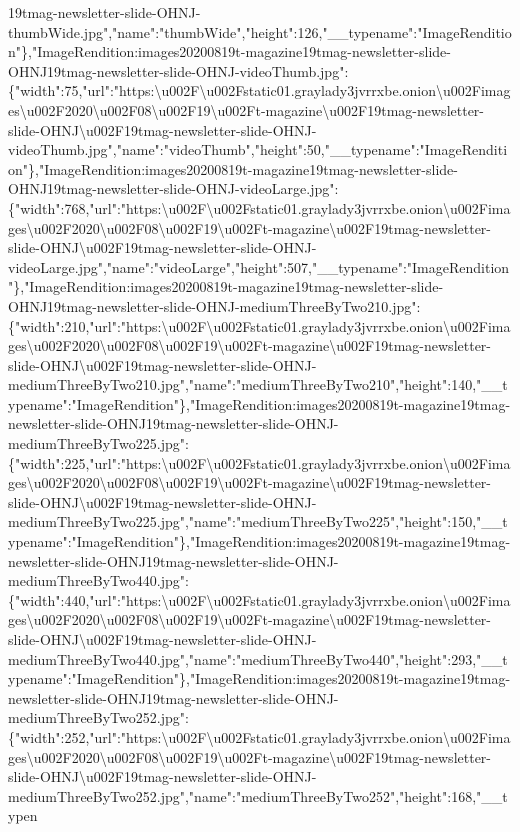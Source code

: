 19tmag-newsletter-slide-OHNJ-thumbWide.jpg","name":"thumbWide","height":126,"\_\_typename":"ImageRendition"\},"ImageRendition:images20200819t-magazine19tmag-newsletter-slide-OHNJ19tmag-newsletter-slide-OHNJ-videoThumb.jpg":\{"width":75,"url":"https:\textbackslash{}u002F\textbackslash{}u002Fstatic01.graylady3jvrrxbe.onion\textbackslash{}u002Fimages\textbackslash{}u002F2020\textbackslash{}u002F08\textbackslash{}u002F19\textbackslash{}u002Ft-magazine\textbackslash{}u002F19tmag-newsletter-slide-OHNJ\textbackslash{}u002F19tmag-newsletter-slide-OHNJ-videoThumb.jpg","name":"videoThumb","height":50,"\_\_typename":"ImageRendition"\},"ImageRendition:images20200819t-magazine19tmag-newsletter-slide-OHNJ19tmag-newsletter-slide-OHNJ-videoLarge.jpg":\{"width":768,"url":"https:\textbackslash{}u002F\textbackslash{}u002Fstatic01.graylady3jvrrxbe.onion\textbackslash{}u002Fimages\textbackslash{}u002F2020\textbackslash{}u002F08\textbackslash{}u002F19\textbackslash{}u002Ft-magazine\textbackslash{}u002F19tmag-newsletter-slide-OHNJ\textbackslash{}u002F19tmag-newsletter-slide-OHNJ-videoLarge.jpg","name":"videoLarge","height":507,"\_\_typename":"ImageRendition"\},"ImageRendition:images20200819t-magazine19tmag-newsletter-slide-OHNJ19tmag-newsletter-slide-OHNJ-mediumThreeByTwo210.jpg":\{"width":210,"url":"https:\textbackslash{}u002F\textbackslash{}u002Fstatic01.graylady3jvrrxbe.onion\textbackslash{}u002Fimages\textbackslash{}u002F2020\textbackslash{}u002F08\textbackslash{}u002F19\textbackslash{}u002Ft-magazine\textbackslash{}u002F19tmag-newsletter-slide-OHNJ\textbackslash{}u002F19tmag-newsletter-slide-OHNJ-mediumThreeByTwo210.jpg","name":"mediumThreeByTwo210","height":140,"\_\_typename":"ImageRendition"\},"ImageRendition:images20200819t-magazine19tmag-newsletter-slide-OHNJ19tmag-newsletter-slide-OHNJ-mediumThreeByTwo225.jpg":\{"width":225,"url":"https:\textbackslash{}u002F\textbackslash{}u002Fstatic01.graylady3jvrrxbe.onion\textbackslash{}u002Fimages\textbackslash{}u002F2020\textbackslash{}u002F08\textbackslash{}u002F19\textbackslash{}u002Ft-magazine\textbackslash{}u002F19tmag-newsletter-slide-OHNJ\textbackslash{}u002F19tmag-newsletter-slide-OHNJ-mediumThreeByTwo225.jpg","name":"mediumThreeByTwo225","height":150,"\_\_typename":"ImageRendition"\},"ImageRendition:images20200819t-magazine19tmag-newsletter-slide-OHNJ19tmag-newsletter-slide-OHNJ-mediumThreeByTwo440.jpg":\{"width":440,"url":"https:\textbackslash{}u002F\textbackslash{}u002Fstatic01.graylady3jvrrxbe.onion\textbackslash{}u002Fimages\textbackslash{}u002F2020\textbackslash{}u002F08\textbackslash{}u002F19\textbackslash{}u002Ft-magazine\textbackslash{}u002F19tmag-newsletter-slide-OHNJ\textbackslash{}u002F19tmag-newsletter-slide-OHNJ-mediumThreeByTwo440.jpg","name":"mediumThreeByTwo440","height":293,"\_\_typename":"ImageRendition"\},"ImageRendition:images20200819t-magazine19tmag-newsletter-slide-OHNJ19tmag-newsletter-slide-OHNJ-mediumThreeByTwo252.jpg":\{"width":252,"url":"https:\textbackslash{}u002F\textbackslash{}u002Fstatic01.graylady3jvrrxbe.onion\textbackslash{}u002Fimages\textbackslash{}u002F2020\textbackslash{}u002F08\textbackslash{}u002F19\textbackslash{}u002Ft-magazine\textbackslash{}u002F19tmag-newsletter-slide-OHNJ\textbackslash{}u002F19tmag-newsletter-slide-OHNJ-mediumThreeByTwo252.jpg","name":"mediumThreeByTwo252","height":168,"\_\_typen